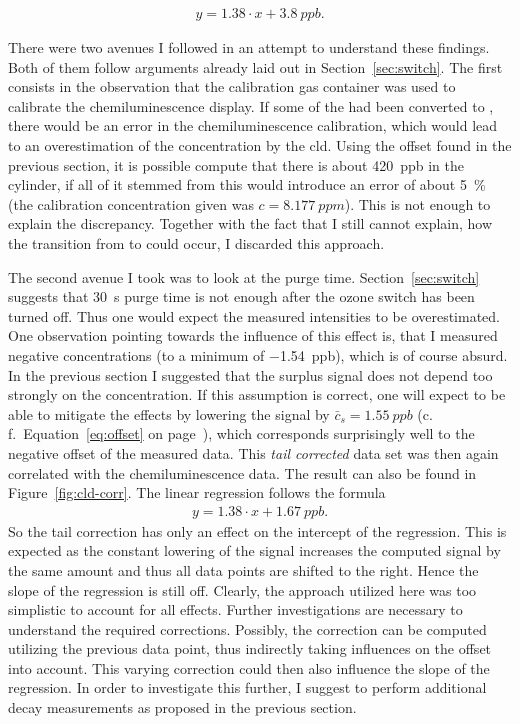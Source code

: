 \begin{align*}
  y = \num{1.38} \cdot x + \SI{3.8}{ppb}.
\end{align*}

There were two avenues I followed in an attempt to understand these
findings. Both of them follow arguments already laid out in
Section~\ref{sec:switch}. The first consists in the observation that
the  calibration gas container was used to calibrate the
chemiluminescence display. If some of the  had been converted
to , there would be an error in the chemiluminescence
calibration, which would lead to an overestimation of the 
concentration by the cld. Using the  offset found in the
previous section, it is possible compute that there is about
\SI{420}{ppb}  in the cylinder, if all of it stemmed from
 this would introduce an error of about \SI{5}{\percent} (the
calibration concentration given was $c = \SI{8.177}{ppm}$). This is
not enough to explain the discrepancy. Together with the fact that I
still cannot explain, how the transition from  to 
could occur, I discarded this approach.

The second avenue I took was to look at the purge time.
Section~\ref{sec:switch} suggests that \SI{30}{\second} purge time is
not enough after the ozone switch has been turned off. Thus one would
expect the measured  intensities to be overestimated. One
observation pointing towards the influence of this effect is, that I
measured negative  concentrations (to a minimum of
\SI{-1.54}{ppb}), which is of course absurd. In the previous section I
suggested that the surplus  signal does not depend too strongly
on the  concentration. If this assumption is correct, one will
expect to be able to mitigate the effects by lowering the 
signal by $\bar c_s = \SI{1.55}{ppb}$ (c.\,f.\
Equation~\eqref{eq:offset} on page~\pageref{eq:offset}), which
corresponds surprisingly well to the negative offset of the measured
data. This \emph{tail corrected} data set was then again correlated
with the chemiluminescence data. The result can also be found in
Figure~\ref{fig:cld-corr}. The linear regression follows the formula
\begin{align*}
  y = \num{1.38} \cdot x + \SI{1.67}{ppb}.
\end{align*}
So the tail correction has only an effect on the intercept of the
regression. This is expected as the constant lowering of the 
signal increases the computed \ch{NO} signal by the same amount and
thus all data points are shifted to the right. Hence the slope of the
regression is still off. Clearly, the approach utilized here was too
simplistic to account for all effects. Further investigations are
necessary to understand the required corrections. Possibly, the
 correction can be computed utilizing the previous 
data point, thus indirectly taking \ch{NO} influences on the offset
into account. This varying \ch{NO2} correction could then also
influence the slope of the regression. In order to investigate this
further, I suggest to perform additional decay measurements as
proposed in the previous section.


